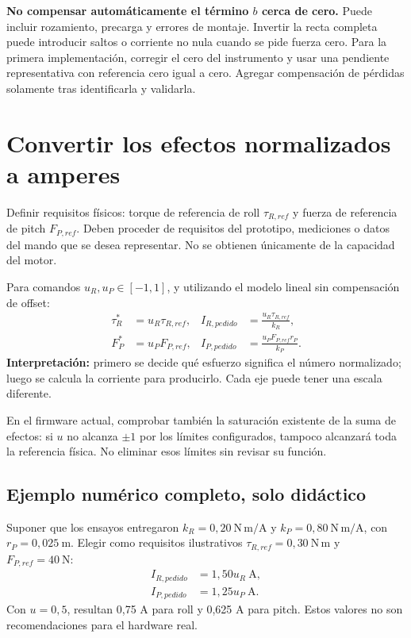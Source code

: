 \documentclass[11pt,a4paper]{article}
\begin{document}
\textbf{No compensar automáticamente el término $b$ cerca de cero.} Puede incluir rozamiento, precarga y errores de montaje. Invertir la recta completa puede introducir saltos o corriente no nula cuando se pide fuerza cero. Para la primera implementación, corregir el cero del instrumento y usar una pendiente representativa con referencia cero igual a cero. Agregar compensación de pérdidas solamente tras identificarla y validarla.

\section{Convertir los efectos normalizados a amperes}
Definir requisitos físicos: torque de referencia de roll $\tau_{R,ref}$ y fuerza de referencia de pitch $F_{P,ref}$. Deben proceder de requisitos del prototipo, mediciones o datos del mando que se desea representar. No se obtienen únicamente de la capacidad del motor.

Para comandos $u_R,u_P\in[-1,1]$, y utilizando el modelo lineal sin compensación de offset:
\begin{align}
\tau_R^*&=u_R\tau_{R,ref}, & I_{R,pedido}&=\frac{u_R\tau_{R,ref}}{k_R},\\
F_P^*&=u_PF_{P,ref}, & I_{P,pedido}&=\frac{u_PF_{P,ref}r_P}{k_P}.
\end{align}
\textbf{Interpretación:} primero se decide qué esfuerzo significa el número normalizado; luego se calcula la corriente para producirlo. Cada eje puede tener una escala diferente.

En el firmware actual, comprobar también la saturación existente de la suma de efectos: si $u$ no alcanza $\pm1$ por los límites configurados, tampoco alcanzará toda la referencia física. No eliminar esos límites sin revisar su función.

\subsection{Ejemplo numérico completo, solo didáctico}
Suponer que los ensayos entregaron $k_R=0{,}20\ \mathrm{N\,m/A}$ y $k_P=0{,}80\ \mathrm{N\,m/A}$, con $r_P=0{,}025\ \mathrm{m}$. Elegir como requisitos ilustrativos $\tau_{R,ref}=0{,}30\ \mathrm{N\,m}$ y $F_{P,ref}=40\ \mathrm{N}$:
\begin{align}
I_{R,pedido}&=1{,}50u_R\ \mathrm{A},\\
I_{P,pedido}&=1{,}25u_P\ \mathrm{A}.
\end{align}
Con $u=0{,}5$, resultan 0,75 A para roll y 0,625 A para pitch. Estos valores no son recomendaciones para el hardware real.
\end{document}
